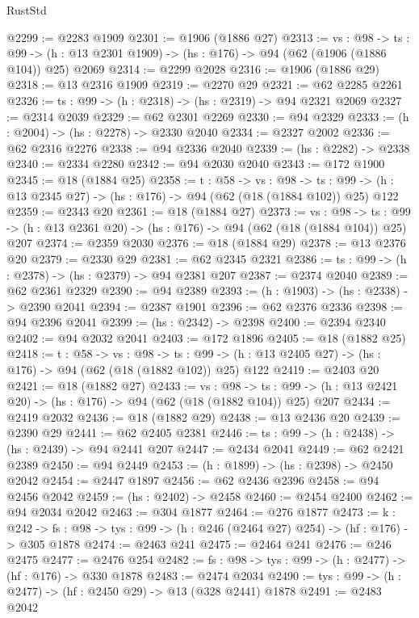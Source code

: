 \begin{lexlean}{RustStd}
\begin{coremodule}
@2299 := @2283 @1909
@2301 := @1906 (@1886 @27)
@2313 := {vs : @98} ->
  {ts : @99} -> (h : @13 @2301 @1909) -> (hs : @176) -> @94 (@62 (@1906 (@1886 @104)) @25) @2069
@2314 := @2299 @2028
@2316 := @1906 (@1886 @29)
@2318 := @13 @2316 @1909
@2319 := @2270 @29
@2321 := @62 @2285 @2261
@2326 := {ts : @99} -> (h : @2318) -> (hs : @2319) -> @94 @2321 @2069
@2327 := @2314 @2039
@2329 := @62 @2301 @2269
@2330 := @94 @2329
@2333 := (h : @2004) -> (hs : @2278) -> @2330 @2040
@2334 := @2327 @2002
@2336 := @62 @2316 @2276
@2338 := @94 @2336 @2040
@2339 := (hs : @2282) -> @2338
@2340 := @2334 @2280
@2342 := @94 @2030 @2040
@2343 := @172 @1900
@2345 := @18 (@1884 @25)
@2358 := {t : @58} ->
  {vs : @98} ->
  {ts : @99} -> (h : @13 @2345 @27) -> (hs : @176) -> @94 (@62 (@18 (@1884 @102)) @25) @122
@2359 := @2343 @20
@2361 := @18 (@1884 @27)
@2373 := {vs : @98} ->
  {ts : @99} -> (h : @13 @2361 @20) -> (hs : @176) -> @94 (@62 (@18 (@1884 @104)) @25) @207
@2374 := @2359 @2030
@2376 := @18 (@1884 @29)
@2378 := @13 @2376 @20
@2379 := @2330 @29
@2381 := @62 @2345 @2321
@2386 := {ts : @99} -> (h : @2378) -> (hs : @2379) -> @94 @2381 @207
@2387 := @2374 @2040
@2389 := @62 @2361 @2329
@2390 := @94 @2389
@2393 := (h : @1903) -> (hs : @2338) -> @2390 @2041
@2394 := @2387 @1901
@2396 := @62 @2376 @2336
@2398 := @94 @2396 @2041
@2399 := (hs : @2342) -> @2398
@2400 := @2394 @2340
@2402 := @94 @2032 @2041
@2403 := @172 @1896
@2405 := @18 (@1882 @25)
@2418 := {t : @58} ->
  {vs : @98} ->
  {ts : @99} -> (h : @13 @2405 @27) -> (hs : @176) -> @94 (@62 (@18 (@1882 @102)) @25) @122
@2419 := @2403 @20
@2421 := @18 (@1882 @27)
@2433 := {vs : @98} ->
  {ts : @99} -> (h : @13 @2421 @20) -> (hs : @176) -> @94 (@62 (@18 (@1882 @104)) @25) @207
@2434 := @2419 @2032
@2436 := @18 (@1882 @29)
@2438 := @13 @2436 @20
@2439 := @2390 @29
@2441 := @62 @2405 @2381
@2446 := {ts : @99} -> (h : @2438) -> (hs : @2439) -> @94 @2441 @207
@2447 := @2434 @2041
@2449 := @62 @2421 @2389
@2450 := @94 @2449
@2453 := (h : @1899) -> (hs : @2398) -> @2450 @2042
@2454 := @2447 @1897
@2456 := @62 @2436 @2396
@2458 := @94 @2456 @2042
@2459 := (hs : @2402) -> @2458
@2460 := @2454 @2400
@2462 := @94 @2034 @2042
@2463 := @304 @1877
@2464 := @276 @1877
@2473 := {k : @242} ->
  {fs : @98} -> {tys : @99} -> (h : @246 (@2464 @27) @254) -> (hf : @176) -> @305 @1878
@2474 := @2463 @241
@2475 := @2464 @241
@2476 := @246 @2475
@2477 := @2476 @254
@2482 := {fs : @98} -> {tys : @99} -> (h : @2477) -> (hf : @176) -> @330 @1878
@2483 := @2474 @2034
@2490 := {tys : @99} -> (h : @2477) -> (hf : @2450 @29) -> @13 (@328 @2441) @1878
@2491 := @2483 @2042

\end{coremodule}
\end{lexlean}
